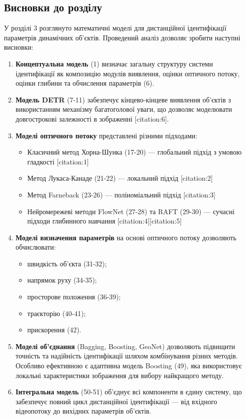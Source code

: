 \documentclass[14pt, a4paper]{extarticle}
\numberwithin{equation}{section}
\begin{document}
\subsection{Висновки до розділу}

У розділі 3 розглянуто математичні моделі для дистанційної ідентифікації параметрів динамічних об'єктів. Проведений аналіз дозволяє зробити наступні висновки:

\begin{enumerate}
    \item \textbf{Концептуальна модель} (1) визначає загальну структуру системи ідентифікації як композицію модулів виявлення, оцінки оптичного потоку, оцінки глибини та обчислення параметрів (6).
    
    \item \textbf{Модель DETR} (7-11) забезпечує кінцево-кінцеве виявлення об'єктів з використанням механізму багатоголової уваги, що дозволяє моделювати довгострокові залежності в зображенні [citation:6].
    
    \item \textbf{Моделі оптичного потоку} представлені різними підходами:
    \begin{itemize}
        \item Класичний метод Хорна-Шунка (17-20) — глобальний підхід з умовою гладкості [citation:1]
        \item Метод Лукаса-Канаде (21-22) — локальний підхід [citation:2]
        \item Метод Farneback (23-26) — поліноміальний підхід [citation:3]
        \item Нейромережеві методи FlowNet (27-28) та RAFT (29-30) — сучасні підходи глибинного навчання [citation:4][citation:5]
    \end{itemize}
    
    \item \textbf{Моделі визначення параметрів} на основі оптичного потоку дозволяють обчислювати:
    \begin{itemize}
        \item швидкість об'єкта (31-32);
        \item напрямок руху (34-35);
        \item просторове положення (36-39);
        \item траєкторію (40-41);
        \item прискорення (42).
    \end{itemize}
    
    \item \textbf{Моделі об'єднання} (Bagging, Boosting, GeoNet) дозволяють підвищити точність та надійність ідентифікації шляхом комбінування різних методів. Особливо ефективною є адаптивна модель Boosting (49), яка використовує локальні характеристики зображення для вибору найкращого методу.
    
    \item \textbf{Інтегральна модель} (50-51) об'єднує всі компоненти в єдину систему, що забезпечує повний цикл дистанційної ідентифікації — від вхідного відеопотоку до вихідних параметрів об'єктів.
\end{enumerate}
\end{document}
